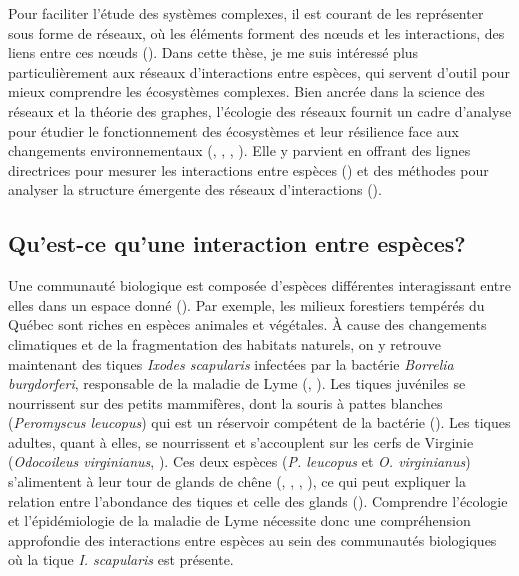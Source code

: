 Pour faciliter l'étude des systèmes complexes, il est courant de les représenter
sous forme de réseaux, où les éléments forment des nœuds et les interactions,
des liens entre ces nœuds (\cite{Newman2003Structure}). Dans cette thèse, je me
suis intéressé plus particulièrement aux réseaux d'interactions entre espèces,
qui servent d'outil pour mieux comprendre les écosystèmes complexes. Bien ancrée
dans la science des réseaux et la théorie des graphes, l'écologie des réseaux
fournit un cadre d'analyse pour étudier le fonctionnement des écosystèmes et
leur résilience face aux changements environnementaux
(\cite{McCann2007Protecting}, \cite{McCann2011Food}, \cite{Proulx2005Network},
\cite{Rooney2012Integrating}). Elle y parvient en offrant des lignes directrices
pour mesurer les interactions entre espèces (\cite{Jordano2016Sampling}) et des
méthodes pour analyser la structure émergente des réseaux d'interactions
(\cite{Delmas2019Analysing}). 

\subsection{Qu'est-ce qu'une interaction entre espèces?} 

Une communauté biologique est composée d'espèces différentes interagissant entre
elles dans un espace donné (\cite{Stroud2015Community}). Par exemple, les
milieux forestiers tempérés du Québec sont riches en espèces animales et
végétales. À cause des changements climatiques et de la fragmentation des
habitats naturels, on y retrouve maintenant des tiques \textit{Ixodes
scapularis} infectées par la bactérie \textit{Borrelia burgdorferi}, responsable
de la maladie de Lyme (\cite{Ogden2009Emergence}, \cite{Simon2014Climate}). Les
tiques juvéniles se nourrissent sur des petits mammifères, dont la souris à
pattes blanches (\textit{Peromyscus leucopus}) qui est un réservoir compétent de
la bactérie (\cite{Donahue1987Reservoir}). Les tiques adultes, quant à elles, se
nourrissent et s'accouplent sur les cerfs de Virginie (\textit{Odocoileus
virginianus}, \cite{Lane1991Lyme}). Ces deux espèces (\textit{P. leucopus} et
\textit{O. virginianus}) s'alimentent à leur tour de glands de chêne
(\cite{McShea1993Variablea}, \cite{Elkinton1996Interactions},
\cite{Wolff1996Population}, \cite{McShea2000Influence}), ce qui peut expliquer
la relation entre l'abondance des tiques et celle des glands
(\cite{Ostfeld2006Climate}). Comprendre l'écologie et l'épidémiologie de la
maladie de Lyme nécessite donc une compréhension approfondie des interactions
entre espèces au sein des communautés biologiques où la tique \textit{I.
scapularis} est présente.

